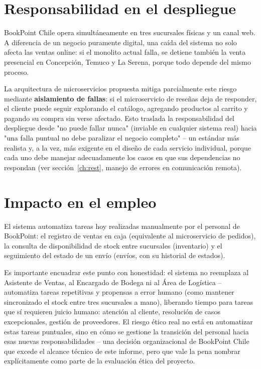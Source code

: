 \section{Responsabilidad en el despliegue}

BookPoint Chile opera simultáneamente en tres sucursales físicas y un canal web. A
diferencia de un negocio puramente digital, una caída del sistema no solo afecta las
ventas online: si el monolito actual falla, se detiene también la venta presencial en
Concepción, Temuco y La Serena, porque todo depende del mismo proceso.

La arquitectura de microservicios propuesta mitiga parcialmente este riesgo mediante
\textbf{aislamiento de fallas}: si el microservicio de reseñas deja de responder, el
cliente puede seguir explorando el catálogo, agregando productos al carrito y pagando
su compra sin verse afectado. Esto traslada la responsabilidad del despliegue desde "no
puede fallar nunca" (inviable en cualquier sistema real) hacia "una falla puntual no
debe paralizar el negocio completo" -- un estándar más realista y, a la vez, más
exigente en el diseño de cada servicio individual, porque cada uno debe manejar
adecuadamente los casos en que sus dependencias no respondan (ver
sección~\ref{ch:rest}, manejo de errores en comunicación remota).

\section{Impacto en el empleo}

El sistema automatiza tareas hoy realizadas manualmente por el personal de BookPoint:
el registro de ventas en caja (equivalente al microservicio de pedidos), la consulta de
disponibilidad de stock entre sucursales (inventario) y el seguimiento del estado de un
envío (envíos, con su historial de estados).

Es importante encuadrar este punto con honestidad: el sistema no reemplaza al
Asistente de Ventas, al Encargado de Bodega ni al Área de Logística -- automatiza
tareas repetitivas y propensas a error humano (como mantener sincronizado el stock
entre tres sucursales a mano), liberando tiempo para tareas que sí requieren juicio
humano: atención al cliente, resolución de casos excepcionales, gestión de proveedores.
El riesgo ético real no está en automatizar estas tareas puntuales, sino en cómo se
gestione la transición del personal hacia esas nuevas responsabilidades -- una decisión
organizacional de BookPoint Chile que excede el alcance técnico de este informe, pero
que vale la pena nombrar explícitamente como parte de la evaluación ética del proyecto.

